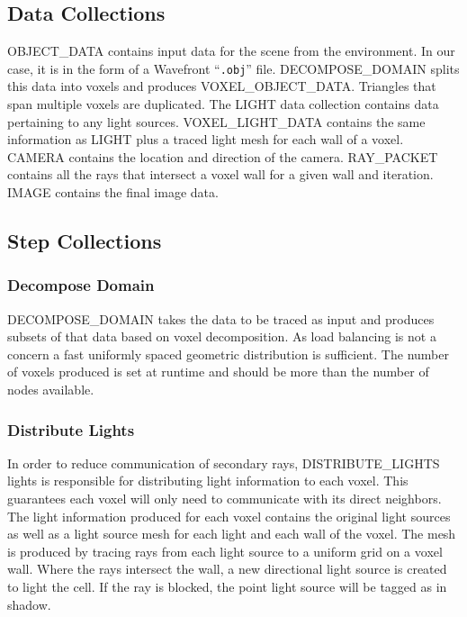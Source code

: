 \subsection{Data Collections}


OBJECT\_DATA contains input data for the scene from the environment.
In our case, it is in the form of a Wavefront ``\texttt{.obj}'' file.
DECOMPOSE\_DOMAIN splits this data into voxels and produces
VOXEL\_OBJECT\_DATA. Triangles that span multiple voxels are
duplicated. The LIGHT data collection contains data pertaining to any
light sources. VOXEL\_LIGHT\_DATA contains the same information as
LIGHT plus a traced light mesh for each wall of a voxel. CAMERA
contains the location and direction of the camera. RAY\_PACKET
contains all the rays that intersect a voxel wall for a given wall and
iteration. IMAGE contains the final image data.

\subsection{Step Collections}

\subsubsection{Decompose Domain}

DECOMPOSE\_DOMAIN takes the data to be traced as input and produces
subsets of that data based on voxel decomposition. As load balancing
is not a concern
a fast uniformly spaced geometric distribution is sufficient. The
number of voxels produced is set at runtime and should be more than
the number of nodes available.

\subsubsection{Distribute Lights}

In order to reduce communication of secondary rays, DISTRIBUTE\_LIGHTS
lights is responsible for distributing light information to each
voxel. This guarantees each voxel will only need to communicate with
its direct neighbors. The light information produced for each voxel
contains the original light sources as well as a light source mesh for
each light and each wall of the voxel. The mesh is produced by tracing
rays from each light source to a uniform grid on a voxel wall. Where the
rays intersect the wall, a new directional light source is created to
light the cell. If the ray is blocked, the point light source will be
tagged as in shadow.

